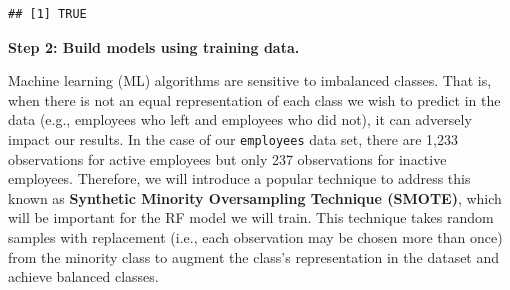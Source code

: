 \documentclass[
]{book}
\newenvironment{Shaded}{\begin{snugshade}}{\end{snugshade}}
\newcommand{\AttributeTok}[1]{\textcolor[rgb]{0.77,0.63,0.00}{#1}}
\newcommand{\CommentTok}[1]{\textcolor[rgb]{0.56,0.35,0.01}{\textit{#1}}}
\newcommand{\ConstantTok}[1]{\textcolor[rgb]{0.00,0.00,0.00}{#1}}
\newcommand{\DecValTok}[1]{\textcolor[rgb]{0.00,0.00,0.81}{#1}}
\newcommand{\FunctionTok}[1]{\textcolor[rgb]{0.00,0.00,0.00}{#1}}
\newcommand{\NormalTok}[1]{#1}
\newcommand{\OtherTok}[1]{\textcolor[rgb]{0.56,0.35,0.01}{#1}}
\newcommand{\SpecialCharTok}[1]{\textcolor[rgb]{0.00,0.00,0.00}{#1}}
\begin{document}
\begin{Shaded}
\end{Shaded}

\begin{verbatim}
## [1] TRUE
\end{verbatim}

\textbf{Step 2: Build models using training data.}

Machine learning (ML) algorithms are sensitive to imbalanced classes. That is, when there is not an equal representation of each class we wish to predict in the data (e.g., employees who left and employees who did not), it can adversely impact our results. In the case of our \texttt{employees} data set, there are 1,233 observations for active employees but only 237 observations for inactive employees. Therefore, we will introduce a popular technique to address this known as \textbf{Synthetic Minority Oversampling Technique (SMOTE)}, which will be important for the RF model we will train. This technique takes random samples with replacement (i.e., each observation may be chosen more than once) from the minority class to augment the class's representation in the dataset and achieve balanced classes.
\end{document}
